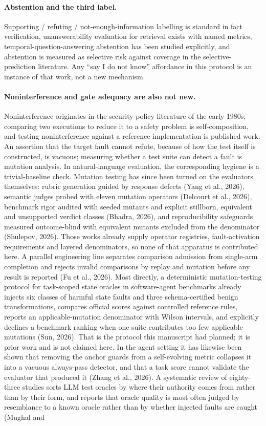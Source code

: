 \documentclass[11pt]{article}
\begin{document}
\paragraph{Abstention and the third label.} Supporting / refuting / not-enough-information labelling is standard in fact verification, unanswerability evaluation for retrieval exists with named metrics, temporal-question-answering abstention has been studied explicitly, and abstention is measured as selective risk against coverage in the selective-prediction literature. Any ``say I do not know'' affordance in this protocol is an instance of that work, not a new mechanism.

\paragraph{Noninterference and gate adequacy are also not new.} Noninterference originates in the security-policy literature of the early 1980s; comparing two executions to reduce it to a safety problem is self-composition, and testing noninterference against a reference implementation is published work. An assertion that the target fault cannot refute, because of how the test itself is constructed, is vacuous; measuring whether a test suite can detect a fault is mutation analysis. In natural-language evaluation, the corresponding hygiene is a trivial-baseline check. Mutation testing has since been turned on the evaluators themselves: rubric generation guided by response defects (Yang et al., 2026), semantic judges probed with eleven mutation operators (Delcourt et al., 2026), benchmark rigor audited with seeded mutants and explicit stillborn, equivalent and unsupported verdict classes (Bhadra, 2026), and reproducibility safeguards measured outcome-blind with equivalent mutants excluded from the denominator (Shulepov, 2026). Those works already supply operator registries, fault-activation requirements and layered denominators, so none of that apparatus is contributed here. A parallel engineering line separates comparison admission from single-arm completion and rejects invalid comparisons by replay and mutation before any result is reported (Fu et al., 2026). Most directly, a deterministic mutation-testing protocol for task-scoped state oracles in software-agent benchmarks already injects six classes of harmful state faults and three schema-certified benign transformations, compares official scores against controlled reference rules, reports an applicable-mutation denominator with Wilson intervals, and explicitly declines a benchmark ranking when one suite contributes too few applicable mutations (Sun, 2026). That is the protocol this manuscript had planned; it is prior work and is not claimed here. In the agent setting it has likewise been shown that removing the anchor guards from a self-evolving metric collapses it into a vacuous always-pass detector, and that a task score cannot validate the evaluator that produced it (Zhang et al., 2026). A systematic review of eighty-three studies sorts LLM test oracles by where their authority comes from rather than by their form, and reports that oracle quality is most often judged by resemblance to a known oracle rather than by whether injected faults are caught (Mughal and 
\end{document}
